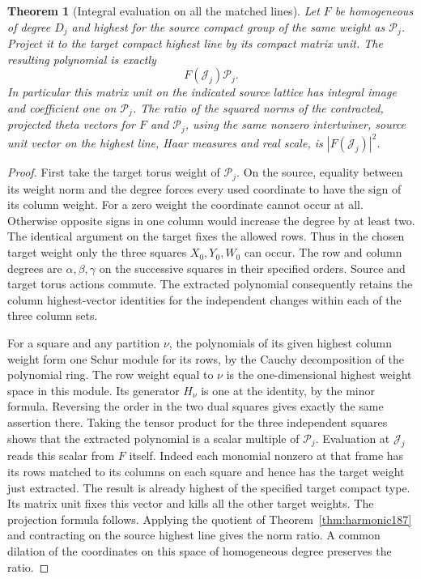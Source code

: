 \documentclass[a4paper,11pt]{article}
\newtheorem{theorem}[proposition]{Theorem}
\theoremstyle{definition}
\theoremstyle{remark}
\numberwithin{equation}{section}
\begin{document}
\begin{theorem}[Integral evaluation on all the matched lines]
\label{thm:frame187}
Let \(F\) be homogeneous of degree \(D_j\) and highest for the
source compact group of the same weight as \(\mathcal P_j\). Project it
to the target compact highest line by its compact matrix unit.
The resulting polynomial is exactly
\[
                        F(\mathcal J_j)\mathcal P_j .
\]
In particular this matrix unit on the indicated source lattice
has integral image and coefficient one on \(\mathcal P_j\). The ratio of
the squared norms of the contracted, projected theta vectors for
\(F\) and \(\mathcal P_j\), using the same nonzero intertwiner, source
unit vector on the highest line, Haar measures and real scale,
is \(|F(\mathcal J_j)|^2\).
\end{theorem}
\begin{proof}
First take the target torus weight of \(\mathcal P_j\). On the source,
equality between its weight norm and the degree forces every
used coordinate to have the sign of its column weight. For a
zero weight the coordinate cannot occur at all. Otherwise
opposite signs in one column would increase the degree by at
least two. The identical argument on the target fixes the
allowed rows. Thus in the chosen target weight only the three
squares \(X_0,Y_0,W_0\) can occur. The row and column degrees
are \(\alpha,\beta,\gamma\) on the successive squares in their
specified orders. Source and target torus actions commute.
The extracted polynomial consequently retains the column
highest-vector identities for the independent changes within
each of the three column sets.

For a square and any partition \(\nu\), the polynomials of its
given highest column weight form one Schur module for its rows,
by the Cauchy decomposition of the polynomial ring. The row
weight equal to \(\nu\) is the one-dimensional highest weight
space in this module. Its generator \(H_\nu\) is one at the
identity, by the minor formula. Reversing the order in the two
dual squares gives exactly the same assertion there. Taking
the tensor product for the three independent squares shows
that the extracted polynomial is a scalar multiple of \(\mathcal P_j\).
Evaluation at \(\mathcal J_j\) reads this scalar from \(F\)
itself. Indeed each monomial nonzero at that frame has its
rows matched to its columns on each square and hence has
the target weight just extracted. The result is already highest
of the specified target compact type. Its matrix unit fixes
this vector and kills all the other target weights. The
projection formula follows. Applying the quotient of
Theorem~\ref{thm:harmonic187} and contracting on the source
highest line gives the norm ratio. A common dilation of the
coordinates on this space of homogeneous degree preserves
the ratio.
\end{proof}
\end{document}
